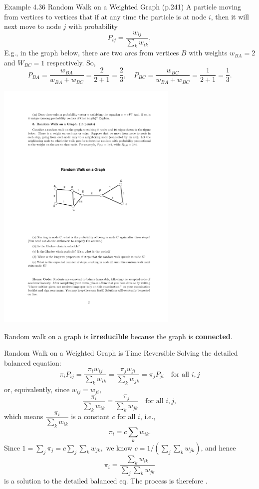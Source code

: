 \documentclass[letterpaper, mathserif]{beamer}
\begin{document}
\begin{frame}{Example 4.36 Random Walk on a Weighted Graph (p.241)}
A particle moving from vertices to vertices that
if at any time the particle is at node $i$, then it will next move to node $j$
with probability
\[
P_{ij} = \frac{w_{ij}}{\sum_k w_{ik}},
\]
E.g., in the graph below, there are two arcs from vertices $B$ with weights $w_{BA}=2$  and $W_{BC}=1$ respectively.
So,
{\small
\[P_{BA}=\frac{w_{BA}}{w_{BA}+w_{BC}}=\frac{2}{2+1}=\frac{2}{3},\quad P_{BC}=\frac{w_{BC}}{w_{BA}+w_{BC}}=\frac{1}{2+1}=\frac{1}{3}.\]}
\begin{center}
\includegraphics[width=0.65\textwidth]{WeightedGraph}
\end{center}
Random walk on a graph is {\bf irreducible} because the graph is {\bf connected}.
\end{frame}
\begin{frame}{Random Walk on a Weighted Graph is Time Reversible}
Solving the detailed balanced equation:
\[
\pi_iP_{ij}=\frac{\pi_iw_{ij}}{\sum_k w_{ik}}=\frac{\pi_jw_{ji}}{\sum_k w_{jk}}=\pi_jP_{ji}\quad\text{for all }i, j
\]
or, equivalently, since $w_{ij}=w_{ji}$,
\[
\frac{\pi_i}{\sum_k w_{ik}}=\frac{\pi_j}{\sum_k w_{jk}}\quad\text{for all }i, j,
\]
which means $\dfrac{\pi_i}{\sum_k w_{ik}}$ is a constant $c$ for all $i$, i.e.,
\[
\pi_i=c\sum_k w_{ik}.
\]
Since $1=\sum_j\pi_j=c\sum_j\sum_k w_{jk},$ we know $c = 1/(\sum_j\sum_k w_{jk})$, and hence
\[
\pi_i=\frac{\sum_k w_{ik}}{\sum_j\sum_k w_{jk}}
\]
is a solution to the detailed balanced eq. The process is therefore .
\end{frame}
\end{document}
